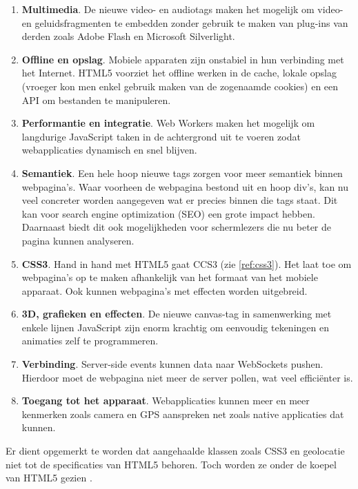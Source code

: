 \begin{enumerate}
\item \textbf{Multimedia}. De nieuwe video- en audiotags maken het mogelijk om video- en geluidsfragmenten te embedden zonder gebruik te maken van plug-ins van derden zoals Adobe Flash en Microsoft Silverlight.

\item \textbf{Offline en opslag}.  Mobiele apparaten zijn onstabiel in hun verbinding met het Internet. HTML5 voorziet het offline werken in de cache, lokale opslag (vroeger kon men enkel gebruik maken van de zogenaamde cookies) en een API om bestanden te manipuleren.

\item \textbf{Performantie en integratie}.  Web Workers maken het mogelijk om langdurige JavaScript taken in de achtergrond uit te voeren zodat webapplicaties dynamisch en snel blijven.

\item \textbf{Semantiek}.  Een hele hoop nieuwe tags zorgen voor meer semantiek binnen webpagina's. Waar voorheen de webpagina bestond uit en hoop div's, kan nu veel concreter worden aangegeven wat er precies binnen die tags staat. Dit kan voor search engine optimization (SEO) een grote impact hebben. Daarnaast biedt dit ook mogelijkheden voor schermlezers die nu beter de pagina kunnen analyseren.

\item \textbf{CSS3}.  Hand in hand met HTML5 gaat CCS3 (zie \ref{ref:css3}). Het laat toe om webpagina's op te maken afhankelijk van het formaat van het mobiele apparaat. Ook kunnen webpagina's met effecten worden uitgebreid. 

\item \textbf{3D, grafieken en effecten}.  De nieuwe canvas-tag in samenwerking met enkele lijnen JavaScript zijn enorm krachtig om eenvoudig tekeningen en animaties zelf te programmeren.

\item \textbf{Verbinding}.  Server-side events kunnen data naar WebSockets pushen. Hierdoor moet de webpagina niet meer de server pollen, wat veel efficiënter is.

\item \textbf{Toegang tot het apparaat}. Webapplicaties kunnen meer en meer kenmerken zoals camera en GPS aanspreken net zoals native applicaties dat kunnen. 
\end{enumerate}

Er dient opgemerkt te worden dat aangehaalde klassen zoals CSS3 en geolocatie niet tot de specificaties van HTML5 behoren. Toch worden ze onder de koepel van HTML5 gezien \cite{MacDonald2011}.

